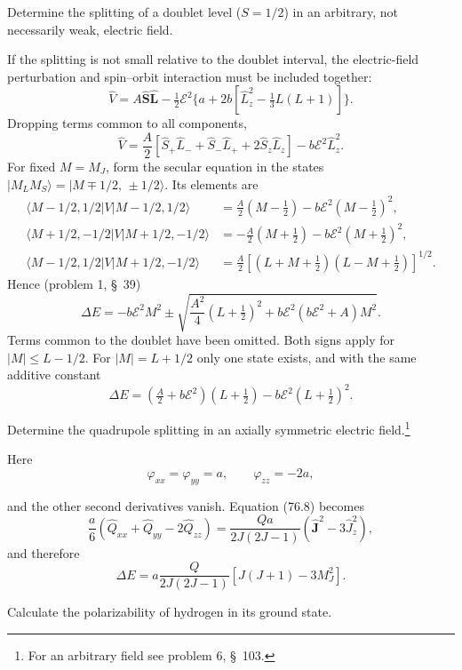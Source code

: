  Determine the splitting of a doublet level ($S=1/2$) in an arbitrary, not necessarily weak, electric field.

\SolutionHeading If the splitting is not small relative to the doublet interval, the electric-field perturbation and spin--orbit interaction must be included together:
\[\widehat V=A\widehat{\mathbf S}\widehat{\mathbf L}-\tfrac12\mathcal E^2\{a+2b[\widehat L_z^2-\tfrac13L(L+1)]\}.\]
Dropping terms common to all components,
\[\widehat V=\frac A2[\widehat S_+\widehat L_-+\widehat S_-\widehat L_++2\widehat S_z\widehat L_z]-b\mathcal E^2\widehat L_z^2.\]
For fixed $M=M_J$, form the secular equation in the states $|M_LM_S\rangle=|M\mp1/2,\,\pm1/2\rangle$. Its elements are
\begin{align*}
\langle M-1/2,1/2|V|M-1/2,1/2\rangle&=\frac A2(M-\tfrac12)-b\mathcal E^2(M-\tfrac12)^2,\\
\langle M+1/2,-1/2|V|M+1/2,-1/2\rangle&=-\frac A2(M+\tfrac12)-b\mathcal E^2(M+\tfrac12)^2,\\
\langle M-1/2,1/2|V|M+1/2,-1/2\rangle&=\frac A2[(L+M+\tfrac12)(L-M+\tfrac12)]^{1/2}.
\end{align*}
Hence (problem 1, \S~39)
\begin{equation}\Delta E=-b\mathcal E^2M^2\pm\sqrt{\frac{A^2}{4}(L+\tfrac12)^2+b\mathcal E^2(b\mathcal E^2+A)M^2}.\tag{1}\end{equation}
Terms common to the doublet have been omitted. Both signs apply for $|M|\leqslant L-1/2$. For $|M|=L+1/2$ only one state exists, and with the same additive constant
\begin{equation}\Delta E=(\tfrac A2+b\mathcal E^2)(L+\tfrac12)-b\mathcal E^2(L+\tfrac12)^2.\tag{2}\end{equation}

 Determine the quadrupole splitting in an axially symmetric electric field.\footnote{For an arbitrary field see problem 6, \S~103.}

\SolutionHeading Here
\[\varphi_{xx}=\varphi_{yy}=a,\qquad \varphi_{zz}=-2a,\]

and the other second derivatives vanish. Equation (76.8) becomes
\[\frac a6(\widehat Q_{xx}+\widehat Q_{yy}-2\widehat Q_{zz})=\frac{Qa}{2J(2J-1)}(\widehat{\mathbf J}^{2}-3\widehat J_z^2),\]
and therefore
\[\Delta E=a\frac{Q}{2J(2J-1)}[J(J+1)-3M_J^2].\]

 Calculate the polarizability of hydrogen in its ground state.

